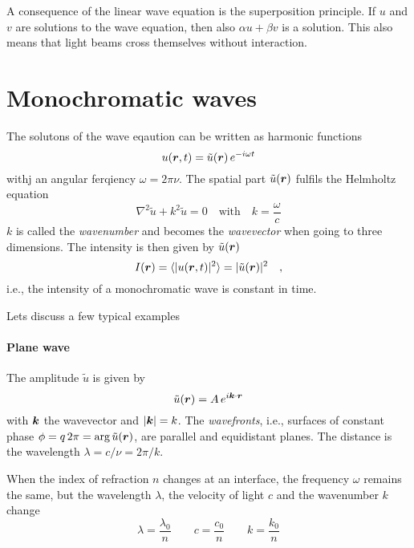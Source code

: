 A consequence of the linear wave equation is the superposition principle. If $u$ and $v$ are solutions to the wave equation, then also $\alpha u + \beta v$ is a solution. This also means that light beams cross themselves without interaction.


\section{Monochromatic waves}

The solutons of the wave eqaution can be written as harmonic functions
\begin{equation}
    u(\boldsymbol{r}, t)  = \tilde{u}(\boldsymbol{r}) \, e^{- i \omega t}
\end{equation}
withj an angular ferqiency $\omega = 2 \pi \nu$. The spatial part $\tilde{u}(\boldsymbol{r})$ fulfils the Helmholtz equation
\begin{equation}
    \nabla^2 \tilde{u} + k^2 \tilde{u} = 0 \quad \text{with} \quad k = \frac{\omega}{c}
\end{equation}
$k$ is called the \emph{wavenumber} and becomes the \emph{wavevector} when going to three dimensions. The intensity is then given by $\tilde{u}(\boldsymbol{r})$
\begin{equation}
    I(\boldsymbol{r}) = \braket{ |u(\boldsymbol{r}, t) |^2 } = |\tilde{u}(\boldsymbol{r}) |^2 \quad , 
\end{equation}
i.e., the intensity of a monochromatic wave is constant in time. 

Lets discuss a few typical examples

\paragraph*{Plane wave} The amplitude $\tilde{u}$ is given by
\begin{equation}
 \tilde{u}(\boldsymbol{r}) = A \, e^{i \boldsymbol{k} \cdot \boldsymbol{r}}
\end{equation}
with $\boldsymbol{k}$ the wavevector and $|\boldsymbol{k}| = k $. The \emph{wavefronts}, i.e., surfaces of constant phase $\phi = q \, 2 \pi =  \arg \tilde{u}(\boldsymbol{r})$, are parallel and equidistant planes. The distance is the wavelength $\lambda = c / \nu = 2 \pi / k$.

When the index of refraction $n$ changes at an interface, the frequency $\omega$ remains the same, but the wavelength $\lambda$, the velocity of light $c$ and the wavenumber $k$ change
\begin{equation}
\lambda = \frac{\lambda_0}{n} \qquad
c = \frac{c_0}{n} \qquad
k = \frac{k_0}{n}
\end{equation}
 

